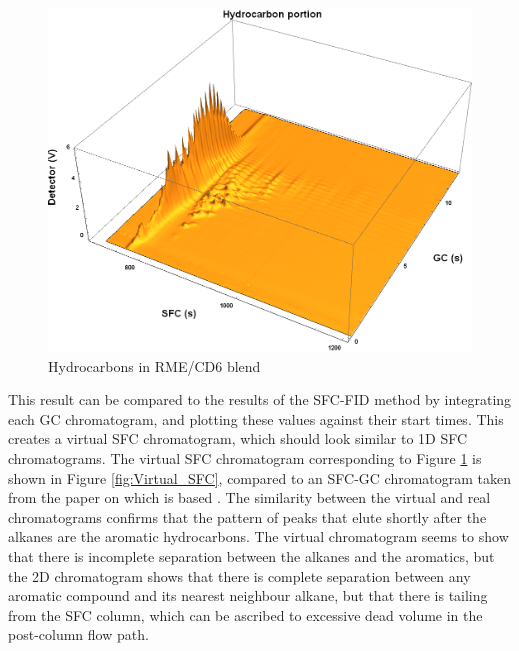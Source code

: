 \begin{figure}
	\centering
	\includegraphics[width=\textwidth]{Figures/Hydrocarbons_Portion.png}
	\decoRule	
	
\caption[Hydrocarbons in RME/CD6 blend.]{Hydrocarbons in RME/CD6 blend}
	
	\label{fig:Hydrocarbons_Portion} 
\end{figure}

This result can be compared to the results of the SFC-FID method by integrating
each \twoD GC chromatogram, and plotting these values against their start times.
This creates a virtual SFC chromatogram, which should look similar to 1D SFC
chromatograms. The virtual SFC chromatogram corresponding to Figure
\ref{fig:Hydrocarbons_Portion} is shown in Figure \ref{fig:Virtual_SFC},
compared to an SFC-GC chromatogram taken from the paper on which 
is based \autocite{DiSanzo1991}. The similarity between the virtual and real
chromatograms confirms that the pattern of peaks that elute shortly after the
alkanes are the aromatic hydrocarbons. The virtual chromatogram seems to show
that there is incomplete separation between the alkanes and the aromatics, but
the 2D chromatogram shows that there is complete separation between any aromatic
compound and its nearest neighbour alkane, but that there is tailing from the
SFC column, which can be ascribed to excessive dead volume in the post-column
flow path.

